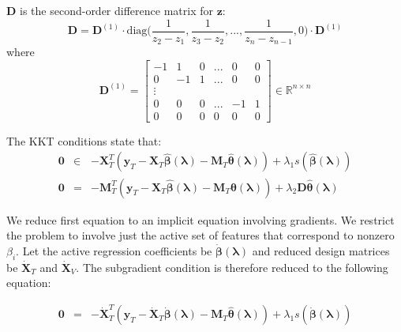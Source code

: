 \documentclass[10pt,letterpaper]{article}
\begin{document}
$\boldsymbol{D}$ is the second-order difference matrix for $\boldsymbol{z}$:
\begin{equation}
\boldsymbol{D} = \boldsymbol{D}^{(1)} \cdot
\text{diag} \big ( \frac{1}{z_{2} - z_1}, \frac{1}{z_{3} - z_2}, ... , \frac{1}{z_{n} - z_{n-1}}, 0 \big )
\cdot \boldsymbol{D}^{(1)}
\end{equation}
where
\begin{equation}
\boldsymbol{D}^{(1)} = 
\begin{bmatrix}
-1 & 1 & 0 & ... & 0 & 0 \\
0 & -1 & 1 & ... & 0 & 0 \\
\vdots \\
0 & 0 & 0 & ... & -1 & 1 \\
0 &0 & 0 &  0  &  0 & 0
\end{bmatrix}
\in
\mathbb{R}^{n\times n}
\end{equation}

The KKT conditions state that:
\begin{equation}
\begin{array}{lcl}
\boldsymbol{0} &\in&
-\boldsymbol{X}_T^T(\boldsymbol{y}_T -
\boldsymbol{X}_T \hat{\boldsymbol{\beta}}(\boldsymbol{\lambda}) - \boldsymbol{M}_T \hat{\boldsymbol{\theta}}(\boldsymbol{\lambda}))
+ \lambda_1 s(\hat{\boldsymbol{\beta}}(\boldsymbol{\lambda})) \\
\boldsymbol{0} &=&
-\boldsymbol{M}_T^T(\boldsymbol{y}_T
- \boldsymbol{X}_T \hat{\boldsymbol{\beta}}(\boldsymbol{\lambda})
- \boldsymbol{M}_T \boldsymbol{\theta}(\boldsymbol{\lambda}))
+ \lambda_2 \boldsymbol{D} \hat{\boldsymbol{\theta}}(\boldsymbol{\lambda})
\end{array}
\end{equation}

We reduce first equation to an implicit equation involving gradients. We restrict the problem to involve just the active set of features that correspond to nonzero $\beta_i$. Let the active regression coefficients be $\dot{\boldsymbol{\beta}}(\boldsymbol{\lambda})$ and reduced design matrices be $\dot{\boldsymbol{X}}_T$ and $\dot{\boldsymbol{X}}_V$. The subgradient condition is therefore reduced to the following equation:

\begin{equation}
\begin{array}{lcl}
\boldsymbol{0} &=&
-\dot{\boldsymbol{X}}_T^T(\boldsymbol{y}_T
- \dot{\boldsymbol{X}}_T \dot{\boldsymbol{\beta}}(\boldsymbol{\lambda})
- \boldsymbol{M}_T \hat{\boldsymbol{\theta}}(\boldsymbol{\lambda}))
+ \lambda_1 s(\dot{\boldsymbol{\beta}}(\boldsymbol{\lambda}))
\end{array}
\end{equation}
\end{document}
